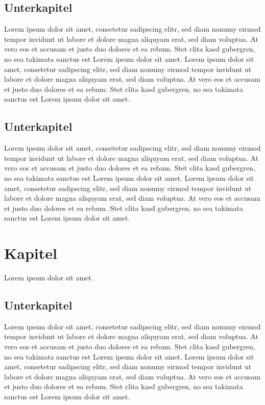 \documentclass[12pt,a4paper,bibliography=totocnumbered,listof=totocnumbered]{scrartcl}
\begin{document}
\subsection{Unterkapitel}
Lorem ipsum dolor sit amet, consetetur sadipscing elitr, sed diam nonumy eirmod tempor invidunt ut labore et dolore magna aliquyam erat, sed diam voluptua. At vero eos et accusam et justo duo dolores et ea rebum. Stet clita kasd gubergren, no sea takimata sanctus est Lorem ipsum dolor sit amet. Lorem ipsum dolor sit amet, consetetur sadipscing elitr, sed diam nonumy eirmod tempor invidunt ut labore et dolore magna aliquyam erat, sed diam voluptua. At vero eos et accusam et justo duo dolores et ea rebum. Stet clita kasd gubergren, no sea takimata sanctus est Lorem ipsum dolor sit amet.

\subsection{Unterkapitel}
Lorem ipsum dolor sit amet, consetetur sadipscing elitr, sed diam nonumy eirmod tempor invidunt ut labore et dolore magna aliquyam erat, sed diam voluptua. At vero eos et accusam et justo duo dolores et ea rebum. Stet clita kasd gubergren, no sea takimata sanctus est Lorem ipsum dolor sit amet. Lorem ipsum dolor sit amet, consetetur sadipscing elitr, sed diam nonumy eirmod tempor invidunt ut labore et dolore magna aliquyam erat, sed diam voluptua. At vero eos et accusam et justo duo dolores et ea rebum. Stet clita kasd gubergren, no sea takimata sanctus est Lorem ipsum dolor sit amet.
\pagebreak

\section{Kapitel}
Lorem ipsum dolor sit amet.

\subsection{Unterkapitel}
Lorem ipsum dolor sit amet, consetetur sadipscing elitr, sed diam nonumy eirmod tempor invidunt ut labore et dolore magna aliquyam erat, sed diam voluptua. At vero eos et accusam et justo duo dolores et ea rebum. Stet clita kasd gubergren, no sea takimata sanctus est Lorem ipsum dolor sit amet. Lorem ipsum dolor sit amet, consetetur sadipscing elitr, sed diam nonumy eirmod tempor invidunt ut labore et dolore magna aliquyam erat, sed diam voluptua. At vero eos et accusam et justo duo dolores et ea rebum. Stet clita kasd gubergren, no sea takimata sanctus est Lorem ipsum dolor sit amet.
\end{document}
